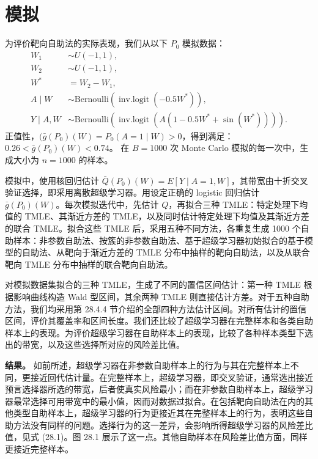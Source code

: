 \section{模拟}

为评价靶向自助法的实际表现，我们从以下 $P_0$ 模拟数据：
\[
\begin{aligned}
 W_1&\sim U(-1,1),\\
 W_2&\sim U(-1,1),\\
 W^*&=W_2-W_1,\\
 A\mid W&\sim\mathrm{Bernoulli}(\operatorname{inv.logit}(-0.5W^*)),\\
 Y\mid A,W&\sim\mathrm{Bernoulli}
 (\operatorname{inv.logit}(A(1-0.5W^*+\sin(W^*)))).
\end{aligned}
\]
正值性，$(\bar g(P_0)(W)=P_0(A=1\mid W)>0$，得到满足：
$0.26<\bar g(P_0)(W)<0.74$。
在 $B=1000$ 次 Monte Carlo 模拟的每一次中，生成大小为 $n=1000$ 的样本。

模拟中，使用核回归估计 $\bar Q(P_0)(W)=E[Y\mid A=1,W]$，其带宽由十折交叉验证选择，即采用离散超级学习器。用设定正确的 logistic 回归估计 $\bar g(P_0)(W)$。每次模拟迭代中，先估计 $Q$，再拟合三种 TMLE：特定处理下均值的 TMLE、其渐近方差的 TMLE，以及同时估计特定处理下均值及其渐近方差的联合 TMLE。拟合这些 TMLE 后，采用五种不同方法，各重复生成 1000 个自助样本：非参数自助法、按簇的非参数自助法、基于超级学习器初始拟合的基于模型的自助法、从靶向于渐近方差的 TMLE 分布中抽样的靶向自助法，以及从联合靶向 TMLE 分布中抽样的联合靶向自助法。

对模拟数据集拟合的三种 TMLE，生成了不同的置信区间估计：第一种 TMLE 根据影响曲线构造 Wald 型区间，其余两种 TMLE 则直接估计方差。对于五种自助方法，我们均采用第 28.4.4 节介绍的全部四种方法估计区间。对所有估计的置信区间，评价其覆盖率和区间长度。我们还比较了超级学习器在完整样本和各类自助样本上的表现。为评价超级学习器在自助样本上的表现，比较了各种样本类型下选出的带宽，以及这些选择所对应的风险差比值。

\noindent\textbf{结果。}\enspace
如前所述，超级学习器在非参数自助样本上的行为与其在完整样本上不同，更接近回代估计量。在完整样本上，超级学习器，即交叉验证，通常选出接近预言选择器所选的带宽，后者使真实风险最小；而在非参数自助样本上，超级学习器最常选择可用带宽中的最小值，因而对数据过拟合。在包括靶向自助法在内的其他类型自助样本上，超级学习器的行为更接近其在完整样本上的行为，表明这些自助方法没有同样的问题。选择行为的这一差异，会影响所得超级学习器的风险差比值，见式 (28.1)。图 28.1 展示了这一点。其他自助样本在风险差比值方面，同样更接近完整样本。

